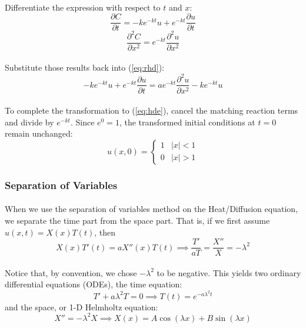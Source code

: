 \paragraph{}
Differentiate the expression with respect to $t$ and $x$:
\begin{equation*}
\frac{\partial C}{\partial t} = -k e^{-kt} u + e^{-kt} \frac{\partial u}{\partial t}
\end{equation*}
\begin{equation*}
\frac{\partial^2 C}{\partial x^2} = e^{-kt} \frac{\partial^2 u}{\partial x^2}
\end{equation*}
\paragraph{}
Substitute those results back into (\ref{eq:rhd}):
\begin{equation*}
-k e^{-kt} u + e^{-kt} \frac{\partial u}{\partial t} = a e^{-kt} \frac{\partial^2 u}{\partial x^2} - k e^{-kt} u
\end{equation*}
\paragraph{}
To complete the transformation to (\ref{eq:hde}), cancel the matching reaction terms and divide by $e^{-kt}$. Since $e^0 = 1$, the transformed initial conditions at $t=0$ remain unchanged:
\begin{equation*}
u(x,0) = \begin{cases} 1 & |x| < 1 \\ 0 & |x| > 1 \end{cases}
\end{equation*}

\subsubsection*{Separation of Variables}
\paragraph{}
When we use the separation of variables method on the Heat/Diffusion equation, we separate the time part from the space part.  That is, if we first assume $u(x,t) = X(x)T(t)$, then
\begin{equation*}
X(x)T'(t) = a X''(x)T(t) \implies \frac{T'}{aT} = \frac{X''}{X} = -\lambda^2
\end{equation*}
\paragraph{}
Notice that, by convention, we chose $-\lambda^2$ to be negative. This yields two ordinary differential equations (ODEs), the time equation: 
\begin{equation*}
T' + a\lambda^2 T = 0 \implies T(t) = e^{-a\lambda^2 t}
\end{equation*}
and the space, or 1-D Helmholtz equation: 
\begin{equation}
\label{eq:hgs}
X'' = -\lambda^2 X \implies X(x) = A\cos(\lambda x) + B\sin(\lambda x)
\end{equation}
